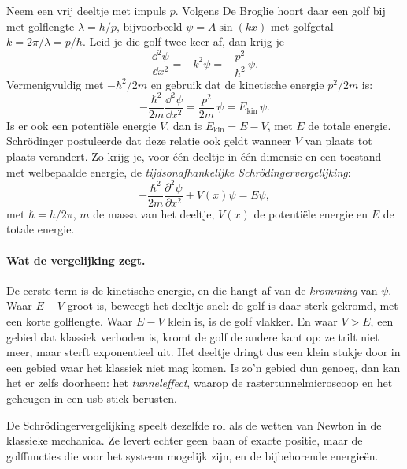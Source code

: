 Neem een vrij deeltje met impuls $p$. Volgens De Broglie hoort daar een golf bij met golflengte $\lambda = h/p$, bijvoorbeeld $\psi = A\sin(kx)$ met golfgetal $k = 2\pi/\lambda = p/\hbar$. Leid je die golf twee keer af, dan krijg je
\[
\frac{\dd^2\psi}{\dd x^2} = -k^2\psi = -\frac{p^2}{\hbar^2}\,\psi .
\]
Vermenigvuldig met $-\hbar^2/2m$ en gebruik dat de kinetische energie $p^2/2m$ is:
\[
-\frac{\hbar^2}{2m}\frac{\dd^2\psi}{\dd x^2} = \frac{p^2}{2m}\,\psi = E_\mathrm{kin}\,\psi .
\]
Is er ook een potentiële energie $V$, dan is $E_\mathrm{kin} = E - V$, met $E$ de totale energie. Schr\"odinger postuleerde dat deze relatie ook geldt wanneer $V$ van plaats tot plaats verandert. Zo krijg je, voor één deeltje in één dimensie en een toestand met welbepaalde energie, de \emph{tijdsonafhankelijke Schr\"odingervergelijking}:
\begin{equation}
\boxed{
-\frac{\hbar^2}{2m}\frac{\partial^2\psi}{\partial x^2} + V(x)\psi = E\psi,
}
\label{eq:Schrodinger}
\end{equation}
met $\hbar=h/2\pi$, $m$ de massa van het deeltje, $V(x)$ de potentiële energie en $E$ de totale energie.

\paragraph{Wat de vergelijking zegt.}
De eerste term is de kinetische energie, en die hangt af van de \emph{kromming} van $\psi$. Waar $E - V$ groot is, beweegt het deeltje snel: de golf is daar sterk gekromd, met een korte golflengte. Waar $E - V$ klein is, is de golf vlakker. En waar $V > E$, een gebied dat klassiek verboden is, kromt de golf de andere kant op: ze trilt niet meer, maar sterft exponentieel uit. Het deeltje dringt dus een klein stukje door in een gebied waar het klassiek niet mag komen. Is zo'n gebied dun genoeg, dan kan het er zelfs doorheen: het \emph{tunneleffect}, waarop de rastertunnelmicroscoop en het geheugen in een usb-stick berusten.

De Schr\"odingervergelijking speelt dezelfde rol als de wetten van Newton in de klassieke mechanica. Ze levert echter geen baan of exacte positie, maar de golffuncties die voor het systeem mogelijk zijn, en de bijbehorende energieën.

